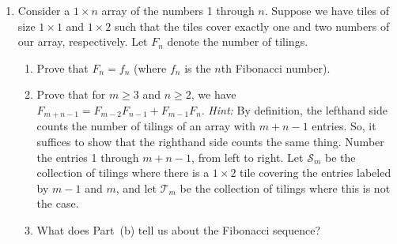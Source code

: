 \documentclass[11pt]{article}%
\theoremstyle{definition}
\begin{document}
\begin{enumerate}
\item Consider a $1\times n$ array of the numbers 1 through $n$. Suppose we have tiles of size $1\times 1$ and $1\times 2$ such that the tiles cover exactly one and two numbers of our array, respectively.  Let $F_n$ denote the number of tilings.
\begin{enumerate}
\item Prove that $F_n=f_n$ (where $f_n$ is the $n$th Fibonacci number).
\item Prove that for $m\geq 3$ and $n\geq 2$, we have $F_{m+n-1}=F_{m-2}F_{n-1}+F_{m-1}F_{n}$. \textit{Hint:} By definition, the lefthand side counts the number of tilings of an array with $m+n-1$ entries.  So, it suffices to show that the righthand side counts the same thing.  Number the entries 1 through $m+n-1$, from left to right. Let $\mathcal{S}_m$ be the collection of tilings where there is a $1\times 2$ tile covering the entries labeled by $m-1$ and $m$, and let $\mathcal{T}_m$ be the collection of tilings where this is not the case.  
\item What does Part~(b) tell us about the Fibonacci sequence?
\end{enumerate}


\end{enumerate}
\end{document}
